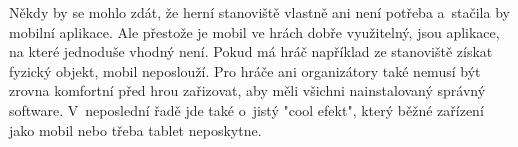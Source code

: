 Někdy by se mohlo zdát, že herní stanoviště vlastně ani není potřeba a~stačila by mobilní aplikace.
Ale přestože je mobil ve hrách dobře využitelný, jsou aplikace, na které jednoduše vhodný není.
Pokud má hráč například ze stanoviště získat fyzický objekt, mobil neposlouží.
Pro hráče ani organizátory také nemusí být zrovna komfortní před hrou zařizovat, aby měli všichni nainstalovaný správný software.
V~neposlední řadě jde také o~jistý "cool efekt", který běžné zařízení jako mobil nebo třeba tablet neposkytne. %

